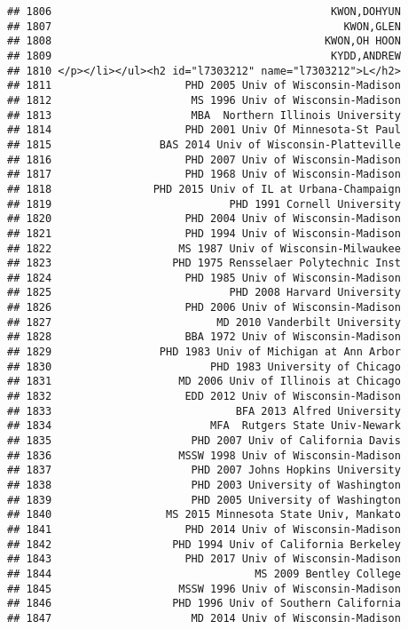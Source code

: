 \documentclass[
]{article}
\begin{document}
\begin{verbatim}
## 1806                                            KWON,DOHYUN
## 1807                                              KWON,GLEN
## 1808                                           KWON,OH HOON
## 1809                                            KYDD,ANDREW
## 1810 </p></li></ul><h2 id="l7303212" name="l7303212">L</h2>
## 1811                     PHD 2005 Univ of Wisconsin-Madison
## 1812                      MS 1996 Univ of Wisconsin-Madison
## 1813                      MBA  Northern Illinois University
## 1814                     PHD 2001 Univ Of Minnesota-St Paul
## 1815                 BAS 2014 Univ of Wisconsin-Platteville
## 1816                     PHD 2007 Univ of Wisconsin-Madison
## 1817                     PHD 1968 Univ of Wisconsin-Madison
## 1818                PHD 2015 Univ of IL at Urbana-Champaign
## 1819                            PHD 1991 Cornell University
## 1820                     PHD 2004 Univ of Wisconsin-Madison
## 1821                     PHD 1994 Univ of Wisconsin-Madison
## 1822                    MS 1987 Univ of Wisconsin-Milwaukee
## 1823                   PHD 1975 Rensselaer Polytechnic Inst
## 1824                     PHD 1985 Univ of Wisconsin-Madison
## 1825                            PHD 2008 Harvard University
## 1826                     PHD 2006 Univ of Wisconsin-Madison
## 1827                          MD 2010 Vanderbilt University
## 1828                     BBA 1972 Univ of Wisconsin-Madison
## 1829                 PHD 1983 Univ of Michigan at Ann Arbor
## 1830                         PHD 1983 University of Chicago
## 1831                    MD 2006 Univ of Illinois at Chicago
## 1832                     EDD 2012 Univ of Wisconsin-Madison
## 1833                             BFA 2013 Alfred University
## 1834                         MFA  Rutgers State Univ-Newark
## 1835                      PHD 2007 Univ of California Davis
## 1836                    MSSW 1998 Univ of Wisconsin-Madison
## 1837                      PHD 2007 Johns Hopkins University
## 1838                      PHD 2003 University of Washington
## 1839                      PHD 2005 University of Washington
## 1840                  MS 2015 Minnesota State Univ, Mankato
## 1841                     PHD 2014 Univ of Wisconsin-Madison
## 1842                   PHD 1994 Univ of California Berkeley
## 1843                     PHD 2017 Univ of Wisconsin-Madison
## 1844                                MS 2009 Bentley College
## 1845                    MSSW 1996 Univ of Wisconsin-Madison
## 1846                   PHD 1996 Univ of Southern California
## 1847                      MD 2014 Univ of Wisconsin-Madison

\end{verbatim}
\end{document}

